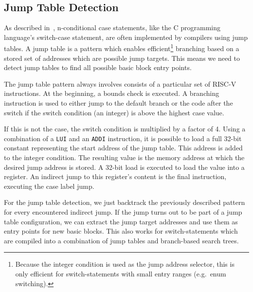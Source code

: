 \documentclass[course=eragp]{aspdoc}
\begin{document}

\subsection{Jump Table Detection}

As described in\ \cite{jump_table_paper}, n-conditional case statements, like the C programming
language's switch-case statement, are often implemented by compilers using jump
tables. A jump table is a pattern which enables efficient\footnote{Because the integer condition is
    used as the jump address selector, this is only efficient for switch-statements with small entry
    ranges (e.g.\ enum switching).} branching based
on a stored set of addresses which are possible jump targets. This means we need to detect jump tables to find
all possible basic block entry points.

\par

The jump table pattern always involves consists of a particular set of RISC-V instructions.
At the beginning, a bounds check is executed. A branching instruction is used to either jump to the
default branch or the code after the switch if the switch condition (an integer) is above the
highest case value.

\par

If this is not the case, the switch condition is multiplied by a factor of 4.
Using a combination of a \texttt{LUI} and an \texttt{ADDI} instruction, it is possible to load a full
32-bit constant\cite{rvspec} representing the start address of the jump table.
This address is added to the integer condition. The resulting value is the memory address
at which the desired jump address is stored. A 32-bit load is executed to load the value into a
register. An indirect jump to this register's content is the final instruction, executing the case
label jump.

\par

For the jump table detection, we just backtrack the previously described pattern for every
encountered indirect jump. If the jump turns out to be part of a jump table configuration, we can
extract the jump target addresses and use them as entry points for new basic blocks. This also works
for switch-statements which are compiled into a combination of jump tables and branch-based search
trees.
\end{document}
